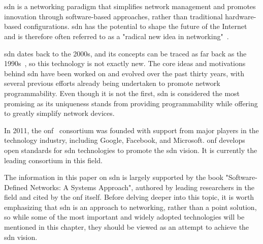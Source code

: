 
%

\chapter[Software Defined Networking]{} %
\label{cha:sdn}

\gls{sdn} is a networking paradigm that simplifies network management and promotes innovation through software-based approaches, rather than traditional hardware-based configurations. \gls{sdn} has the potential to shape the future of the Internet and is therefore often referred to as a "radical new idea in networking"~\cite{nunes_survey_2014}. 

\gls{sdn} dates back to the 2000s, and its concepts can be traced as far back as the 1990s~\cite{feamster_road_2013}, so this technology is not exactly new. The core ideas and motivations behind \gls{sdn} have been worked on and evolved over the past thirty years, with several previous efforts already being undertaken to promote network programmability\cite{feamster_road_2013}. Even though it is not the first, \gls{sdn} is considered the most promising as its uniqueness stands from providing programmability while offering to greatly simplify network devices\cite{xia_survey_2015}.  

In 2011, the \gls{onf}~\cite{noauthor_open_nodate} consortium was founded with support from major players in the technology industry, including Google, Facebook, and Microsoft. \gls{onf} develops open standards for \gls{sdn} technologies to promote the \gls{sdn} vision. It is currently the leading consortium in this field.  

The information in this paper on \gls{sdn} is largely supported by the book "Software-Defined Networks: A Systems Approach"\cite{peterson_software-defined_2021}, authored by leading researchers in the field and cited by the \gls{onf} itself. Before delving deeper into this topic, it is worth emphasizing that \gls{sdn} is an approach to networking, rather than a point solution, so while some of the most important and widely adopted technologies will be mentioned in this chapter, they should be viewed as an attempt to achieve the \gls{sdn} vision.


